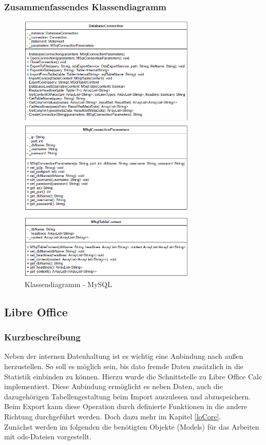 \subsubsection{Zusammenfassendes Klassendiagramm}
\label{mysqlClasses}
\begin{figure}[h]
\centering
\includegraphics[width=0.75\textwidth]{images/mysql.png}
\caption{Klassendiagramm - MySQL}
\end{figure}

\subsection{Libre Office}
\label{subsectionLibreOffice}

\subsubsection{Kurzbeschreibung}
\label{loDescription}
Neben der internen Datenhaltung ist es wichtig eine Anbindung {\frqq}nach außen{\flqq} herzustellen. So soll es möglich sein, bis dato fremde Daten zusätzlich in die Statistik einbinden zu können. Hierzu wurde die Schnittstelle zu Libre Office Calc implementiert. Diese Anbindung ermöglicht es neben Daten, auch die dazugehörigen Tabellengestaltung beim Import auszulesen und abzuspeichern. Beim Export kann diese Operation durch definierte Funktionen in die andere Richtung durchgeführt werden. Doch dazu mehr im Kapitel \ref{loCore}.\\
Zunächst werden im folgenden die benötigten Objekte (Models) für das Arbeiten mit ods-Dateien vorgestellt.

